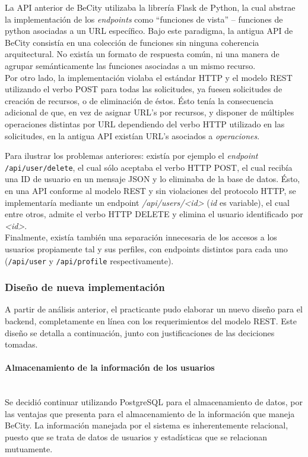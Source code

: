 \documentclass[11pt,letterpaper]{article}
\begin{document}
La API anterior de BeCity utilizaba la librería Flask de Python, la cual abstrae la implementación de los \emph{endpoints} como ``funciones de vista'' -- funciones de python asociadas a un URL específico. Bajo este paradigma, la antigua API de BeCity consistía en una colección de funciones sin ninguna coherencia arquitectural. No existía un formato de respuesta común, ni una manera de agrupar semánticamente las funciones asociadas a un mismo recurso. \\

Por otro lado, la implementación violaba el estándar HTTP y el modelo REST utilizando el verbo POST para todas las solicitudes, ya fuesen solicitudes de creación de recursos, o de eliminación de éstos. Ésto tenía la consecuencia adicional de que, en vez de asignar URL's por recursos, y disponer de múltiples operaciones distintas por URL dependiendo del verbo HTTP utilizado en las solicitudes, en la antigua API existían URL's asociados a \emph{operaciones}.

Para ilustrar los problemas anteriores: existía por ejemplo el \emph{endpoint} \texttt{/api/user/delete}, el cual sólo aceptaba el verbo HTTP POST, el cual recibía una ID de usuario en un mensaje JSON y lo eliminaba de la base de datos. Ésto, en una API conforme al modelo REST y sin violaciones del protocolo HTTP, se implementaría mediante un endpoint \emph{/api/users/\textless id\textgreater} (\emph{id} es variable), el cual entre otros, admite el verbo HTTP DELETE y elimina el usuario identificado por \emph{\textless id\textgreater}.\\

Finalmente, existía también una separación innecesaria de los accesos a los usuarios propiamente tal y sus perfiles, con endpoints distintos para cada uno (\texttt{/api/user} y \texttt{/api/profile} respectivamente).

\newpage
\subsubsection{Diseño de nueva implementación}

A partir de análisis anterior, el practicante pudo elaborar un nuevo diseño para el backend, completamente en línea con los requerimientos del modelo REST. Este diseño se detalla a continuación, junto con justificaciones de las deciciones tomadas.

\paragraph{Almacenamiento de la información de los usuarios\\\\}
Se decidió continuar utilizando PostgreSQL para el almacenamiento de datos, por las ventajas que presenta para el almacenamiento de la información que maneja BeCity. La información manejada por el sistema es inherentemente relacional, puesto que se trata de datos de usuarios y estadísticas que se relacionan mutuamente.\\
\end{document}
